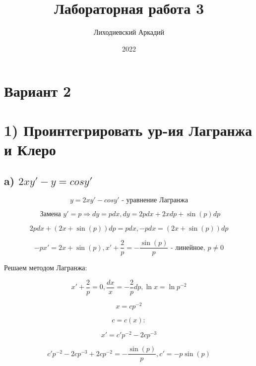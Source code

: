 \documentclass{article}
\title{ Лабораторная работа 3}
\author{Лиходиевский Аркадий}
\date{2022}
\begin{document}
\maketitle

\section*{Вариант 2}
\section*{1) Проинтегрировать ур-ия Лагранжа и Клеро}
\subsection*{a) $ 2xy' - y = cosy'$}

\begin{equation*}
    y = 2xy' - cosy' \text{ - уравнение Лагранжа}
\end{equation*}

\begin{equation*}
    \text{ Замена } y' = p \Rightarrow dy = pdx, dy = 2pdx + 2xdp + \sin{(p)}dp
\end{equation*}

\begin{equation*}
    2pdx + (2x + \sin{(p)})dp = pdx, -pdx = (2x + \sin{(p)})dp
\end{equation*}

\begin{equation*}
    -px' = 2x + \sin{(p)} , x' + \frac{2}{p} = -\frac{\sin{(p)}}{p} \text{ - линейное, } p \ne 0
\end{equation*}

Решаем методом Лагранжа:

\begin{equation*}
    x' + \frac{2}{p} = 0, \frac{dx}{x} = -\frac{2}{p}dp, \ln{x} = \ln{p^{-2}}
\end{equation*}

\begin{equation*}
    x = cp^{-2}
\end{equation*}

\begin{equation*}
    c = c(x):    
\end{equation*}

\begin{equation*}
  x' = c'p^{-2} - 2cp^{-3}
\end{equation*}

\begin{equation*}
    c'p^{-2} - 2cp^{-3} + 2cp^{-2} = -\frac{\sin{(p)}}{p}, c' = -p\sin{(p)}
\end{equation*}
\end{document}

